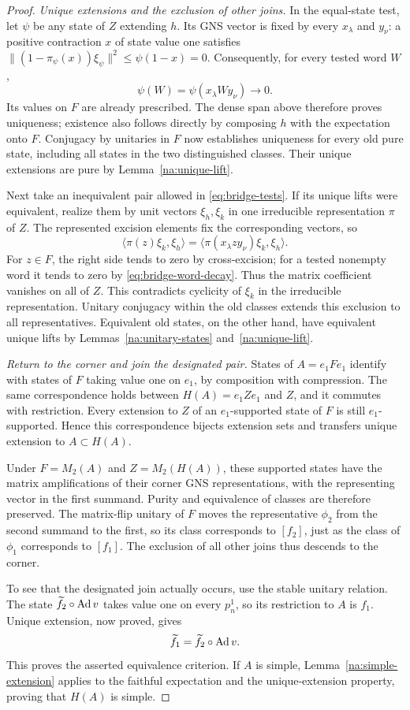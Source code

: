 \begin{proof}
\medskip\noindent
\emph{Unique extensions and the exclusion of other joins.}
In the equal-state test, let $\psi$ be any state of $Z$ extending $h$.
Its GNS vector is fixed by every $x_\lambda$ and $y_\nu$: a positive
contraction $x$ of state value one satisfies
$\|(1-\pi_\psi(x))\xi_\psi\|^2\leq\psi(1-x)=0$.
Consequently, for every tested word $W$,
\[
 \psi(W)=\psi(x_\lambda Wy_\nu)\longrightarrow0.
\]
Its values on $F$ are already prescribed. The dense span above
therefore proves uniqueness; existence also follows directly by
composing $h$ with the expectation onto $F$. Conjugacy by unitaries
in $F$ now establishes uniqueness for every old pure state, including
all states in the two distinguished classes. Their unique extensions
are pure by Lemma~\ref{na:unique-lift}.

Next take an inequivalent pair allowed in
\eqref{eq:bridge-tests}. If its unique lifts were equivalent, realize
them by unit vectors $\xi_h,\xi_k$ in one irreducible representation
$\pi$ of $Z$. The represented excision elements fix the corresponding
vectors, so
\[
 \langle\pi(z)\xi_k,\xi_h\rangle
 =\langle\pi(x_\lambda zy_\nu)\xi_k,\xi_h\rangle.
\]
For $z\in F$, the right side tends to zero by cross-excision; for a
tested nonempty word it tends to zero by
\eqref{eq:bridge-word-decay}. Thus the matrix coefficient vanishes on
all of $Z$. This contradicts cyclicity of $\xi_k$ in the irreducible
representation. Unitary conjugacy within the old classes extends this
exclusion to all representatives. Equivalent old states, on the other
hand, have equivalent unique lifts by
Lemmas~\ref{na:unitary-states} and~\ref{na:unique-lift}.

\medskip\noindent
\emph{Return to the corner and join the designated pair.}
States of $A=e_1Fe_1$ identify with states of $F$ taking value one on
$e_1$, by composition with compression. The same correspondence holds
between $H(A)=e_1Ze_1$ and $Z$, and it commutes with restriction.
Every extension to $Z$ of an $e_1$-supported state of $F$ is still
$e_1$-supported. Hence this correspondence bijects extension sets and
transfers unique extension to $A\subset H(A)$.

Under $F=M_2(A)$ and $Z=M_2(H(A))$, these supported states have the
matrix amplifications of their corner GNS representations, with the
representing vector in the first summand. Purity and equivalence of
classes are therefore preserved. The matrix-flip unitary of $F$
moves the representative $\phi_2$ from the second summand to the
first, so its class corresponds to $[f_2]$, just as the class of
$\phi_1$ corresponds to $[f_1]$. The exclusion of all other joins
thus descends to the corner.

To see that the designated join actually occurs, use the stable
unitary relation. The state $\widetilde f_2\circ\operatorname{Ad} v$ takes value
one on every $p_n^1$, so its restriction to $A$ is $f_1$. Unique
extension, now proved, gives
\[
 \widetilde f_1=\widetilde f_2\circ\operatorname{Ad} v.
\]
This proves the asserted equivalence criterion. If $A$ is simple,
Lemma~\ref{na:simple-extension} applies to the faithful expectation
and the unique-extension property, proving that $H(A)$ is simple.
\end{proof}
